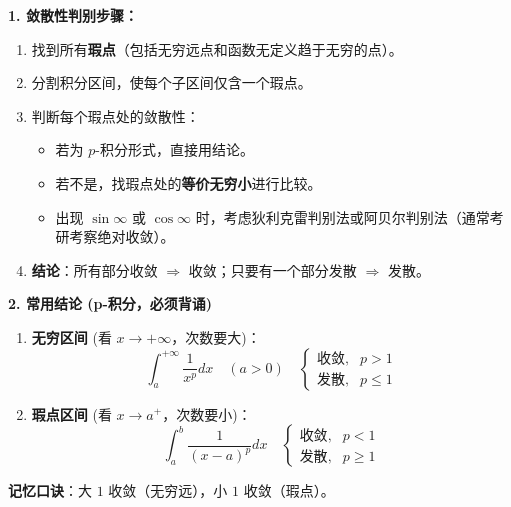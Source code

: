 \documentclass[a4paper,12pt]{ctexart}
\begin{document}
\textbf{1. 敛散性判别步骤：}
\begin{enumerate}
    \item 找到所有\textbf{瑕点}（包括无穷远点和函数无定义趋于无穷的点）。
    \item 分割积分区间，使每个子区间仅含一个瑕点。
    \item 判断每个瑕点处的敛散性：
    \begin{itemize}
        \item 若为 $p$-积分形式，直接用结论。
        \item 若不是，找瑕点处的\textbf{等价无穷小}进行比较。
        \item 出现 $\sin \infty$ 或 $\cos \infty$ 时，考虑狄利克雷判别法或阿贝尔判别法（通常考研考察绝对收敛）。
    \end{itemize}
    \item \textbf{结论}：所有部分收敛 $\Rightarrow$ 收敛；只要有一个部分发散 $\Rightarrow$ 发散。
\end{enumerate}

\textbf{2. 常用结论 (p-积分，必须背诵)}
\begin{tcolorbox}[colback=white, colframe=myblue, title=\textbf{P-积分敛散性结论}]
    \begin{enumerate}
        \item \textbf{无穷区间} (看 $x \to +\infty$，次数要大)：
        \[ \int_a^{+\infty} \frac{1}{x^p} dx \quad (a>0) \quad \begin{cases} \text{收敛}, & p > 1 \\ \text{发散}, & p \le 1 \end{cases} \]
        
        \item \textbf{瑕点区间} (看 $x \to a^+$，次数要小)：
        \[ \int_a^b \frac{1}{(x-a)^p} dx \quad \begin{cases} \text{收敛}, & p < 1 \\ \text{发散}, & p \ge 1 \end{cases} \]
    \end{enumerate}
    \textbf{记忆口诀}：大 $1$ 收敛（无穷远），小 $1$ 收敛（瑕点）。
\end{tcolorbox}
\end{document}
